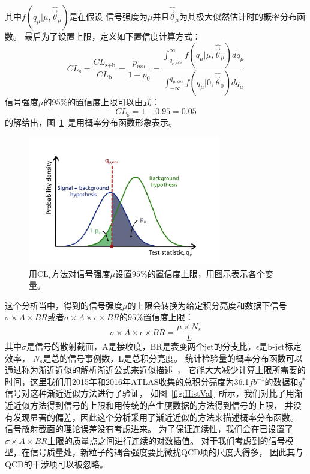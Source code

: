 其中$ f\left(   q_{\mu}|\mu, \hat{\vec{\theta}}_{\mu}   \right) $是在假设
信号强度为$\mu$并且$\hat{\vec{\theta}}_{\mu}$为其极大似然估计时的概率分布函数。
最后为了设置上限，定义如下置信度计算方式：
\begin{equation} 
\label{eq:Limit6}
CL_\text{s}=\frac{CL_\text{s+b}}{CL_\text{b}}=\frac{p_{mu}}{1-p_0}=
\frac{\int^{\infty}_{q_{\mu,obs}} f\left(   q_{\mu}|\mu, \hat{\vec{\theta}}_{\mu}   \right) dq_{\mu}}
{\int_{-\infty}^{q_{\mu,obs}} f\left(   q_{\mu}|0, \hat{\vec{\theta}}_0  \right) dq_{\mu}}
\end{equation}
信号强度$\mu$的$95\%$的置信度上限可以由式：
\begin{equation} 
\label{eq:Limit7}
CL_\text{s}=1-0.95=0.05
\end{equation}
的解给出，图~\ref{fig:CLs}~是用概率分布函数形象表示。

\begin{figure}[!ht]
        \centering
                \includegraphics[width=0.75\textwidth]{figuresDijet/10-LimitSettingResults/CLs.jpg}
        \caption{用CL$_\text{s}$方法对信号强度$\mu$设置$95\%$的置信度上限，用图示表示各个变量。}
        \label{fig:CLs}
\end{figure}


这个分析当中，得到的信号强度$\mu$的上限会转换为给定积分亮度和数据下信号$\sigma\times A \times BR$或者$\sigma\times A \times \epsilon \times BR$的$95\%$置信度上限：
\begin{equation} 
\label{eq:Limit8}
\sigma\times A \times \epsilon \times BR =\frac{\mu\times N_s}{L}
\end{equation}
其中$\sigma$是信号的散射截面，A是接收度，BR是衰变两个jet的分支比，$\epsilon$是b-jet标定效率，
$N_s$是总的信号事例数，L是总积分亮度。
统计检验量的概率分布函数可以通过称为渐近近似的解析渐近公式来近似描述~\cite{Cowan:2010js}，
它能大大减少计算上限所需要的时间，这里我们用2015年和2016年ATLAS收集的总积分亮度为36.1$fb^{-1}$的数据和$q^*$信号对这种渐近近似方法进行了验证，
如图~\ref{fig:HistVal}~所示，我们对比了用渐近近似方法得到信号的上限和用传统的产生赝数据的方法得到信号的上限，
并没有发现显著的偏差，因此这个分析采用了渐近近似的方法来描述概率分布函数。
信号散射截面的理论误差没有考虑进来。
为了保证连续性，我们会在已设置了$\sigma\times A \times BR$上限的质量点之间进行连续的对数插值。
对于我们考虑到的信号模型，在信号质量处，新粒子的耦合强度要比微扰QCD项的尺度大得多，
因此其与QCD的干涉项可以被忽略。

